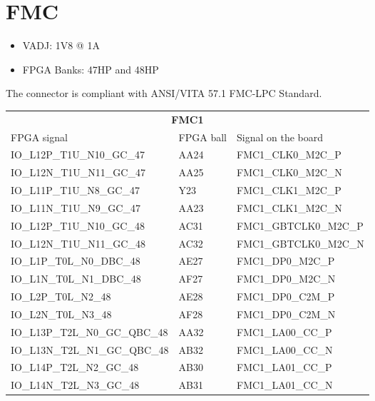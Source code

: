 \section{FMC}



\begin{itemize}
	\item VADJ: 1V8 @ 1A
	\item FPGA Banks: 47HP and 48HP
\end{itemize}


The connector is compliant with ANSI/VITA 57.1 FMC-LPC Standard.\\

\begin{footnotesize}
	\begin{longtable}{|p{7cm}|p{1cm}|p{5cm}|}
		\hline
		\multicolumn{3}{|c|}{\multirow{2}{*}{\textbf{\large{FMC1}}}}\\
		\multicolumn{3}{|c|}{} \\ \hline 
		FPGA signal	&	FPGA ball	&	Signal on the board	\\ \hline
		IO\_L12P\_T1U\_N10\_GC\_47	&	AA24	&	FMC1\_CLK0\_M2C\_P	\\ \hline
		IO\_L12N\_T1U\_N11\_GC\_47	&	AA25	&	FMC1\_CLK0\_M2C\_N	\\ \hline
		IO\_L11P\_T1U\_N8\_GC\_47	&	Y23	&	FMC1\_CLK1\_M2C\_P	\\ \hline
		IO\_L11N\_T1U\_N9\_GC\_47	&	AA23	&	FMC1\_CLK1\_M2C\_N	\\ \hline
		IO\_L12P\_T1U\_N10\_GC\_48	&	AC31	&	FMC1\_GBTCLK0\_M2C\_P	\\ \hline
		IO\_L12N\_T1U\_N11\_GC\_48	&	AC32	&	FMC1\_GBTCLK0\_M2C\_N	\\ \hline
		IO\_L1P\_T0L\_N0\_DBC\_48	&	AE27	&	FMC1\_DP0\_M2C\_P	\\ \hline
		IO\_L1N\_T0L\_N1\_DBC\_48	&	AF27	&	FMC1\_DP0\_M2C\_N	\\ \hline
		IO\_L2P\_T0L\_N2\_48	&	AE28	&	FMC1\_DP0\_C2M\_P	\\ \hline
		IO\_L2N\_T0L\_N3\_48	&	AF28	&	FMC1\_DP0\_C2M\_N	\\ \hline
		IO\_L13P\_T2L\_N0\_GC\_QBC\_48	&	AA32	&	FMC1\_LA00\_CC\_P	\\ \hline
		IO\_L13N\_T2L\_N1\_GC\_QBC\_48	&	AB32	&	FMC1\_LA00\_CC\_N	\\ \hline
		IO\_L14P\_T2L\_N2\_GC\_48	&	AB30	&	FMC1\_LA01\_CC\_P	\\ \hline
		IO\_L14N\_T2L\_N3\_GC\_48	&	AB31	&	FMC1\_LA01\_CC\_N	\\ \hline

\end{longtable}
\end{footnotesize}
